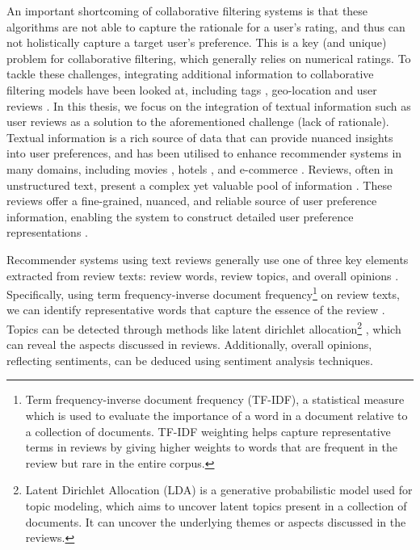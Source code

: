 An important shortcoming of collaborative filtering systems is that these algorithms are not able to capture the rationale for a user’s rating, and thus can not holistically capture a target user’s preference. This is a key (and unique) problem for collaborative filtering, which generally relies on numerical ratings. To tackle these challenges, integrating additional information to collaborative filtering models have been looked at, including tags \cite{zhou2003learning}, geo-location \cite{hu2014your} and user reviews \cite{srifi2020recommender}. In this thesis, we focus on the integration of textual information such as user reviews as a solution to the aforementioned challenge (lack of rationale). Textual information is a rich source of data that can provide nuanced insights into user preferences, and has been utilised to enhance recommender systems in many domains, including movies \cite{diao2014jointly}, hotels \cite{musat2013recommendation}, and e-commerce \cite{he2016ups}. Reviews, often in unstructured text, present a complex yet valuable pool of information \cite{shoja2019customer}. These reviews offer a fine-grained, nuanced, and reliable source of user preference information, enabling the system to construct detailed user preference representations \cite{zhang2014urcf}. 

Recommender systems using text reviews generally use one of three  key elements extracted from review texts: review words, review topics, and overall opinions \cite{chen2015augmenting}. Specifically, using term frequency-inverse document frequency\footnote{Term frequency-inverse document frequency (TF-IDF), a statistical measure which is used to evaluate the importance of a word in a document relative to a collection of documents. TF-IDF weighting helps capture representative terms in reviews by giving higher weights to words that are frequent in the review but rare in the entire corpus.} on review texts, we can identify representative words that capture the essence of the review \cite{chen2015augmenting}. Topics can be detected through methods like latent dirichlet allocation\footnote{Latent Dirichlet Allocation (LDA) is a generative probabilistic model used for topic modeling, which aims to uncover latent topics present in a collection of documents. It can uncover the underlying themes or aspects discussed in the reviews.} \cite{chen2015augmenting}, which can reveal the aspects discussed in reviews. Additionally, overall opinions, reflecting sentiments, can be deduced using sentiment analysis techniques. 

